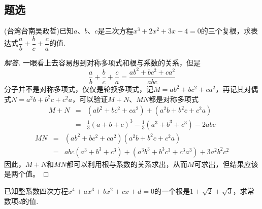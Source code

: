 \subsection{题选}
\label{sec:exercises-for-polynome}


\begin{exercise}
  (台湾台南吴政哲)已知$a$、$b$、$c$是三次方程$x^3+2x^2+3x+4=0$的三个复根，求表达式$\dfrac{a}{b}+\dfrac{b}{c}+\dfrac{c}{a}$的值.
\end{exercise}

\exerciseFrom[\url{http://kuing.orzweb.net/viewthread.php?tid=4850}]

\exerciseSolvedDate[2017-09-05]

\begin{proof}[解答]
  一眼看上去容易想到对称多项式和根与系数的关系，但是
  \[ \frac{a}{b}+\frac{b}{c}+\frac{c}{a} = \frac{ab^2+bc^2+ca^2}{abc} \]
  分子并不是对称多项式，仅仅是轮换多项式，记$M=ab^2+bc^2+ca^2$，再记其对偶式$N=a^2b+b^2c+c^2a$，可以验证$M+N$、$MN$都是对称多项式
  \begin{eqnarray*}
    M+N & = & (ab^2+bc^2+ca^2) + (a^2b+b^2c+c^2a) \\
    & = & \frac{1}{3}(a+b+c)^3-\frac{1}{3}(a^3+b^3+c^3)-2abc
  \end{eqnarray*}
  \begin{eqnarray*}
    MN & = &(ab^2+bc^2+ca^2)(a^2b+b^2c+c^2a) \\
    & = & abc(a^3+b^3+c^3)+(a^3b^3+b^3c^3+c^3a^3)+3a^2b^2c^2
  \end{eqnarray*}
  因此，$M+N$和$MN$都可以利用根与系数的关系求出，从而$M$可求出，但结果应该是两个值。
\end{proof}

\begin{exercise}
  已知整系数四次方程$x^4+ax^3+bx^2+cx+d=0$的一个根是$1+\sqrt{2}+\sqrt{3}$，求常数项$d$的值.
\end{exercise}

\exerciseFrom[\url{http://kuing.orzweb.net/viewthread.php?tid=4866}]

\exerciseSolvedDate[2017-09-18]

